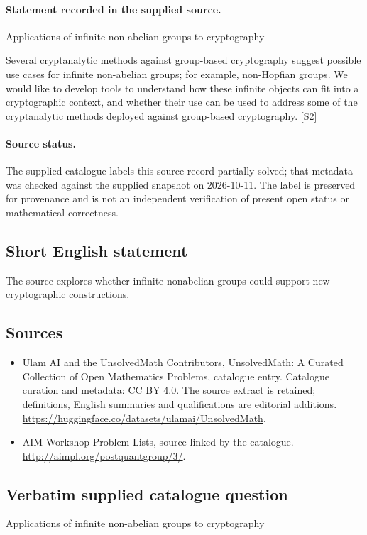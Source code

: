 \documentclass[11pt]{article}
\begin{document}
\paragraph{Statement recorded in the supplied source.}
Applications of infinite non-abelian groups to cryptography

Several cryptanalytic methods against group-based cryptography suggest possible use cases for infinite non-abelian groups; for example, non-Hopfian groups. We would like to develop tools to understand how these infinite objects can fit into a cryptographic context, and whether their use can be used to address some of the cryptanalytic methods deployed against group-based cryptography. \href{http://aimpl.org/postquantgroup/3/}{[S2]}
\paragraph{Source status.}
The supplied catalogue labels this source record partially solved; that metadata was checked against the supplied snapshot on 2026-10-11. The label is preserved for provenance and is not an independent verification of present open status or mathematical correctness.
\subsection{Short English statement}
The source explores whether infinite nonabelian groups could support new cryptographic constructions.
\subsection{Sources}
\begin{itemize}
\item[S1] Ulam AI and the UnsolvedMath Contributors, UnsolvedMath: A Curated Collection of Open Mathematics Problems, catalogue entry. Catalogue curation and metadata: CC BY 4.0. The source extract is retained; definitions, English summaries and qualifications are editorial additions.
\url{https://huggingface.co/datasets/ulamai/UnsolvedMath}.
\item[S2] AIM Workshop Problem Lists, source linked by the catalogue.
\url{http://aimpl.org/postquantgroup/3/}.
\end{itemize}
\subsection{Verbatim supplied catalogue question}
Applications of infinite non-abelian groups to cryptography
\end{document}
